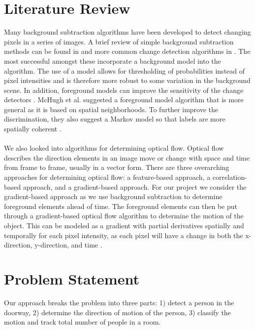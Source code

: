 \documentclass[12pt,oneside]{article} %
\begin{document}
\section{Literature Review}  %
Many background subtraction algorithms have been developed to detect changing pixels in a series of images.
A brief review of simple background subtraction methods can be found in \cite{Piccardi04} and
more common change detection algorithms in \cite{Goyette14}.
The most successful amongst these incorporate a background model into the algorithm. The use of a model
allows for thresholding of probabilities instead of pixel intensities and is therefore more robust to some variation
in the background scene. In addition, foreground models can improve the sensitivity of the change detectors 
\cite{Elgammal02}. McHugh et al. suggested a foreground model algorithm that is more general as it
is based on spatial neighborhoods. To further improve the discrimination, they also suggest a Markov model
so that labels are more spatially coherent
\cite{Mchugh09}.
\\ \\
We also looked into algorithms for determining optical flow. Optical flow describes the direction elements in an image move or change with space and time from frame to frame, usually in a vector form. There are three overarching approaches for determining optical flow: a feature-based approach, a correlation-based approach, and a gradient-based approach. For our project we consider the gradient-based approach as we use background subtraction to determine foreground elements ahead of time. The foreground elements can then be put through a gradient-based optical flow algorithm to determine the motion of the object. This can be modeled as a gradient with partial derivatives spatially and temporally for each pixel intensity, as each pixel will have a change in both the x-direction, y-direction, and time \cite{Smith97}.

\section{Problem Statement}  %
Our approach breaks the problem into three parts: 1) detect a person in the doorway, 2) determine the direction of 
motion of the person, 3) classify the motion and track total number of people in a room.
\end{document}
